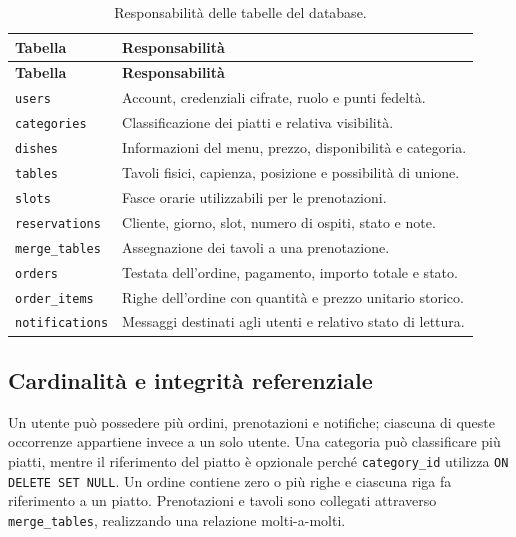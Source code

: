 \documentclass[12pt,a4paper]{article}
\newcommand{\code}[1]{\nolinkurl{#1}}
\begin{document}
\begin{longtable}{p{3.2cm}p{10.6cm}}
\caption{Responsabilità delle tabelle del database.}\label{tab:db-tables}\\
\toprule
\textbf{Tabella} & \textbf{Responsabilità} \\
\midrule
\endfirsthead
\toprule
\textbf{Tabella} & \textbf{Responsabilità} \\
\midrule
\endhead
\code{users} & Account, credenziali cifrate, ruolo e punti fedeltà. \\
\code{categories} & Classificazione dei piatti e relativa visibilità. \\
\code{dishes} & Informazioni del menu, prezzo, disponibilità e categoria. \\
\code{tables} & Tavoli fisici, capienza, posizione e possibilità di unione. \\
\code{slots} & Fasce orarie utilizzabili per le prenotazioni. \\
\code{reservations} & Cliente, giorno, slot, numero di ospiti, stato e note. \\
\code{merge\_tables} & Assegnazione dei tavoli a una prenotazione. \\
\code{orders} & Testata dell'ordine, pagamento, importo totale e stato. \\
\code{order\_items} & Righe dell'ordine con quantità e prezzo unitario storico. \\
\code{notifications} & Messaggi destinati agli utenti e relativo stato di lettura. \\
\bottomrule
\end{longtable}

\subsection{Cardinalità e integrità referenziale}

Un utente può possedere più ordini, prenotazioni e notifiche; ciascuna di queste
occorrenze appartiene invece a un solo utente. Una categoria può classificare
più piatti, mentre il riferimento del piatto è opzionale perché
\code{category\_id} utilizza \code{ON DELETE SET NULL}. Un ordine contiene
zero o più righe e ciascuna riga fa riferimento a un piatto. Prenotazioni e
tavoli sono collegati attraverso \code{merge\_tables}, realizzando una
relazione molti-a-molti.
\end{document}
